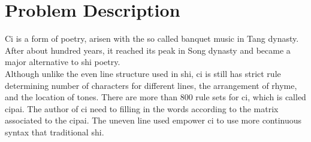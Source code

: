 \section{Problem Description}
Ci is a form of poetry, arisen with the so called banquet music in Tang dynasty. After about hundred years, it reached its peak in Song dynasty and became a major alternative to shi poetry\cite{cai2008chinesepoetry}.\\

Although unlike the even line structure used in shi, ci is still has strict rule determining number of characters for different lines, the arrangement of rhyme, and the location of tones. There are more than 800 rule sets for ci, which is called cipai\cite{wikici}. The author of ci need to filling in the words according to the matrix associated to the cipai. The uneven line used empower ci to use more continuous syntax that traditional shi\cite{cai2008chinesepoetry}.